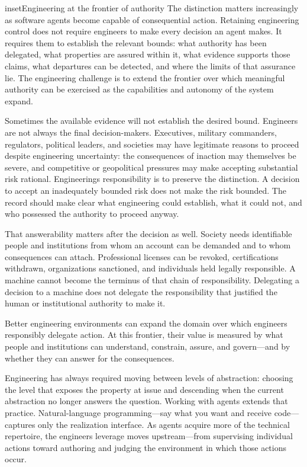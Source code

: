 \begin{bookbox}{inset}{Engineering at the frontier of authority}
The distinction matters increasingly as software agents become capable of consequential action. Retaining engineering control does not require engineers to make every decision an agent makes. It requires them to establish the relevant bounds: what authority has been delegated, what properties are assured within it, what evidence supports those claims, what departures can be detected, and where the limits of that assurance lie. The engineering challenge is to extend the frontier over which meaningful authority can be exercised as the capabilities and autonomy of the system expand.

Sometimes the available evidence will not establish the desired bound. Engineers are not always the final decision-makers. Executives, military commanders, regulators, political leaders, and societies may have legitimate reasons to proceed despite engineering uncertainty: the consequences of inaction may themselves be severe, and competitive or geopolitical pressures may make accepting substantial risk rational. Engineering\textquotesingle s responsibility is to preserve the distinction. A decision to accept an inadequately bounded risk does not make the risk bounded. The record should make clear what engineering could establish, what it could not, and who possessed the authority to proceed anyway.

That answerability matters after the decision as well. Society needs identifiable people and institutions from whom an account can be demanded and to whom consequences can attach. Professional licenses can be revoked, certifications withdrawn, organizations sanctioned, and individuals held legally responsible. A machine cannot become the terminus of that chain of responsibility. Delegating a decision to a machine does not delegate the responsibility that justified the human or institutional authority to make it.

Better engineering environments can expand the domain over which engineers responsibly delegate action. At this frontier, their value is measured by what people and institutions can understand, constrain, assure, and govern---and by whether they can answer for the consequences.
\end{bookbox}


Engineering has always required moving between levels of abstraction: choosing the level that exposes the property at issue and descending when the current abstraction no longer answers the question. Working with agents extends that practice. Natural-language programming---say what you want and receive code---captures only the realization interface. As agents acquire more of the technical repertoire, the engineer\textquotesingle s leverage moves upstream---from supervising individual actions toward authoring and judging the environment in which those actions occur.

